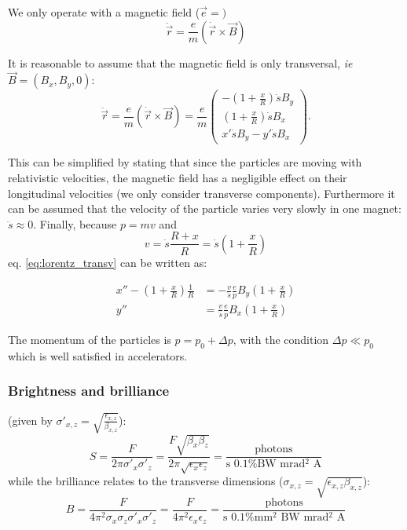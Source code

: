 We only operate with a magnetic field ($\vec{e} = )$
\begin{equation}
\ddot{\vec{r}} = \frac{e}{m}(\dot{\vec{r}} \times \vec{B})
\end{equation}

It is reasonable to assume that the magnetic field is only transversal, \textit{ie} $\vec{B} = (B_x,B_y,0)$:
\begin{equation}
\label{eq:lorentz_transv}
\ddot{\vec{r}} = \frac{e}{m}(\dot{\vec{r}} \times \vec{B})
= \frac{e}{m}
    \begin{pmatrix}
        -\left(1+\frac{x}{R}\right)\dot{s}B_y \\
        \left(1+\frac{x}{R}\right)\dot{s}B_x \\
        x'\dot{s}B_y - y'\dot{s}B_x
    \end{pmatrix}.
\end{equation}

This can be simplified by stating that since the particles are moving with relativistic velocities, the magnetic field has a negligible effect on their longitudinal velocities (we only consider transverse components). Furthermore it can be assumed that the velocity of the particle varies very slowly in one magnet: $\ddot{s} \approx 0$.  Finally, because $p=mv$ and 
\begin{equation}
v = \dot{s} \frac{R+x}{R} = \dot{s} \left(1+\frac{x}{R}\right)
\end{equation}
eq. \ref{eq:lorentz_transv} can be written as:

\begin{align}
x''-\left(1+\frac{x}{R}\right)\frac{1}{R} &= -\frac{v}{\dot{s}}\frac{e}{p} B_y\left(1+\frac{x}{R}\right) \nonumber\\
y'' &= \frac{v}{\dot{s}}\frac{e}{p} B_x\left(1+\frac{x}{R}\right)
\end{align}

The momentum of the particles is $p = p_0+\Delta p$, with the condition $\Delta p \ll p_0$ which is well satisfied in accelerators.

\subsubsection{Brightness and brilliance}
\label{sec:brightness_brillance}
(given by $\sigma'_{x,z}=\sqrt{\frac{\epsilon_{x,z}}{\beta_{x,z}}}$):
\begin{equation}
S = \frac{F}{2 \pi \sigma'_x \sigma'_z} = \frac{F \sqrt{\beta_x \beta_z}}{2 \pi \sqrt{\epsilon_x \epsilon_z}} = \frac{\text{photons}}{\text{s 0.1\% BW mrad$^2$ A}}
\end{equation}
while the brilliance relates to the transverse dimensions ($\sigma_{x,z}=\sqrt{\epsilon_{x,z}\beta_{x,z}}$):
\begin{equation}
B = \frac{F}{4 \pi^2 \sigma_x \sigma_z \sigma'_x \sigma'_z} = \frac{F}{4 \pi^2 \epsilon_x \epsilon_z} = \frac{\text{photons}}{\text{s 0.1\% mm$^2$ BW mrad$^2$ A}}
\end{equation}

